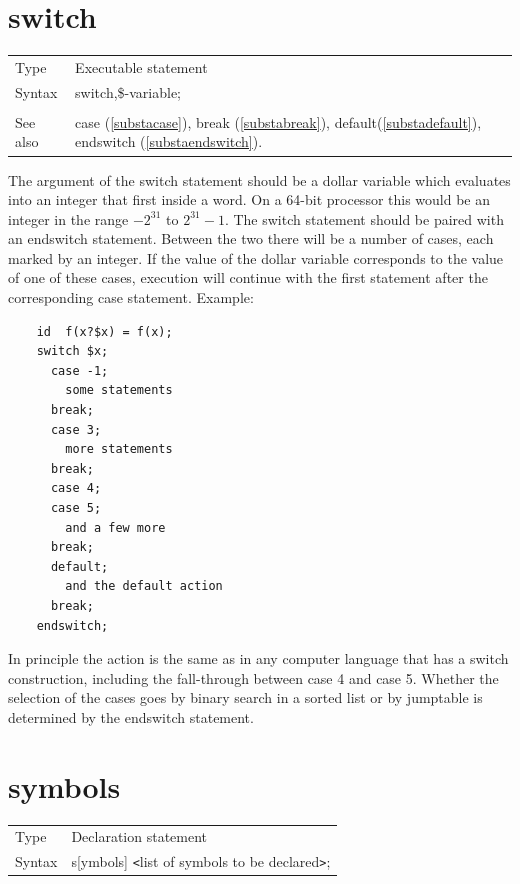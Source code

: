 %
\section{switch}
\label{substaswitch}

\noindent \begin{tabular}{ll}
Type & Executable statement\\
Syntax & switch,\$-variable; \\
\\ See also & case (\ref{substacase}), break (\ref{substabreak}),
		 default(\ref{substadefault}), endswitch (\ref{substaendswitch}).
\end{tabular} \vspace{4mm}

\noindent The argument of the switch statement should be a dollar variable 
which evaluates into an integer that first inside a {\FORM} word.
On a 64-bit processor this would be an integer in the range $-2^{31}$ to 
$2^{31}-1$. The switch statement should be paired with an endswitch 
statement. Between the two there will be a number of cases, each marked by 
an integer. If the value of the dollar variable corresponds to the value of 
one of these cases, execution will continue with the first statement after 
the corresponding case statement. Example:
\begin{verbatim}
    id  f(x?$x) = f(x);
    switch $x;
      case -1;
        some statements
      break;
      case 3;
        more statements
      break;
      case 4;
      case 5;
        and a few more
      break;
      default;
        and the default action
      break;
    endswitch;
\end{verbatim}
In principle the action is the same as in any computer language that has a 
switch construction, including the fall-through between case 4 and case 5. 
Whether the selection of the cases goes by binary search in a sorted list 
or by jumptable is determined by the endswitch statement.


\vspace{10mm}
%
 
\section{symbols}
\label{substasymbols}

\noindent \begin{tabular}{ll}
Type & Declaration statement\\
Syntax & s[ymbols] {\tt<}list of symbols to be declared{\tt>};
\end{tabular}\vspace{4mm}

